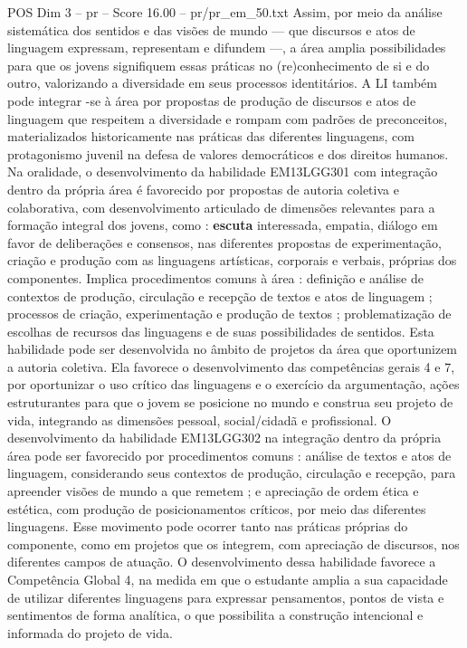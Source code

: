 \begin{textsample}{POS Dim 3 – pr – Score 16.00 – pr/pr\_em\_50.txt}
Assim, por meio da análise sistemática dos sentidos e das visões de mundo — que discursos e atos de linguagem expressam, representam e difundem —, a área amplia possibilidades para que os jovens signifiquem essas práticas no (re)conhecimento de si e do outro, valorizando a diversidade em seus processos identitários.
A LI também pode integrar -se à área por propostas de produção de discursos e atos de linguagem que respeitem a diversidade e rompam com padrões de preconceitos, materializados historicamente nas práticas das diferentes linguagens, com protagonismo juvenil na defesa de valores democráticos e dos direitos humanos.
Na oralidade, o desenvolvimento da habilidade EM13LGG301 com integração dentro da própria área é favorecido por propostas de autoria coletiva e colaborativa, com desenvolvimento articulado de dimensões relevantes para a formação integral dos jovens, como : \textbf{escuta} interessada, empatia, diálogo em favor de deliberações e consensos, nas diferentes propostas de experimentação, criação e produção com as linguagens artísticas, corporais e verbais, próprias dos componentes.
Implica procedimentos comuns à área : definição e análise de contextos de produção, circulação e recepção de textos e atos de linguagem ; processos de criação, experimentação e produção de textos ; problematização de escolhas de recursos das linguagens e de suas possibilidades de sentidos.
Esta habilidade pode ser desenvolvida no âmbito de projetos da área que oportunizem a autoria coletiva.
Ela favorece o desenvolvimento das competências gerais 4 e 7, por oportunizar o uso crítico das linguagens e o exercício da argumentação, ações estruturantes para que o jovem se posicione no mundo e construa seu projeto de vida, integrando as dimensões pessoal, social/cidadã e profissional.
O desenvolvimento da habilidade EM13LGG302 na integração dentro da própria área pode ser favorecido por procedimentos comuns : análise de textos e atos de linguagem, considerando seus contextos de produção, circulação e recepção, para apreender visões de mundo a que remetem ; e apreciação de ordem ética e estética, com produção de posicionamentos críticos, por meio das diferentes linguagens.
Esse movimento pode ocorrer tanto nas práticas próprias do componente, como em projetos que os integrem, com apreciação de discursos, nos diferentes campos de atuação.
O desenvolvimento dessa habilidade favorece a Competência Global 4, na medida em que o estudante amplia a sua capacidade de utilizar diferentes linguagens para expressar pensamentos, pontos de vista e sentimentos de forma analítica, o que possibilita a construção intencional e informada do projeto de vida.

\end{textsample}
